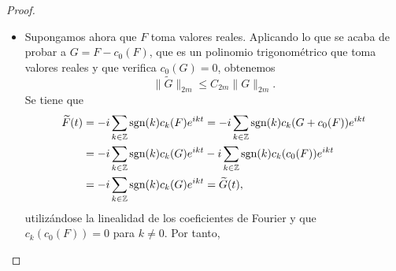 \documentclass[a4paper, 12pt]{book}
\begin{document}
\begin{proof}
\begin{itemize}
\begin{align*}
            &=\Bigl( \frac{1}{2\pi}\integral{-\pi}{\pi}{F(t)^{2k\frac{2m}{2k}}}\Bigr)^{\frac{2k}{2m}}\Bigl( \frac{1}{2\pi}\integral{-\pi}{\pi}{\widetilde{F}(t)^{(2m-2k)\frac{2m}{2m-2k}}}\Bigr)^{\frac{2m-2k}{2m}} \\
            &= \|F\|_{2m}^{2k}\|\widetilde{F}\|_{2m}^{2m-2k}.
        \end{align*}
        Si $k = m$, sigue siendo cierta la desigualdad $\|F^{2k}\widetilde{F}^{2m-2k}\|_1 \leq \|F\|_{2m}^{2k}\|\widetilde{F}\|_{2m}^{2m-2k}$. Tenemos entonces
        \[\|\widetilde{F}\|_{2m}^{2m} \leq \sum_{k=1}^m \binom{2m}{2k}\|F\|_{2m}^{2k}\|\widetilde{F}\|_{2m}^{2m-2k}.\]
        Dividiendo por $\|\widetilde{F}\|_{2m}^{2m}$ (si fuese $\widetilde{F} = 0$ en casi todo punto no hay nada que probar),
        \[1 \leq \sum_{k=1}^m \binom{2m}{2k}\Bigl(\frac{\|F\|_{2m}}{\|\widetilde{F}\|_{2m}}\Bigr)^{2k}.\]
        Sea $R = \frac{\|F\|_{2m}}{\|\widetilde{F}\|_{2m}}$ y consideremos la función $\varphi \colon [0,\infty)\to\R$ dada por
        \[\varphi(t) = \sum_{k=1}^m \binom{2m}{2k}t^{2k}.\]
        La última desigualdad nos dice que $\varphi(R) \geq 1$. También tenemos que $\varphi$ es continua, estrictamente creciente y tal que
        \[\lim_{t \to \infty} \varphi(t) = \infty, \qquad \varphi(0) = 0.\]
        Por el teorema de los valores intermedios, existe $C > 0$ (que solo depende de $m$) tal que $\varphi(C) = 1$. Como $\varphi(R) \geq 1$ y $\varphi$ es estrictamente creciente, tiene que ser $R \geq C$, luego
        \[\|F\|_{2m} \geq C\|\widetilde{F}\|_{2m}.\]
        Llamando $C_{2m} = \frac{1}{C}$, obtenemos que
        \[\|\widetilde{F}\|_{2m} \leq C_{2m}\|F\|_{2m}.\]
        \item Supongamos ahora que $F$ toma valores reales. Aplicando lo que se acaba de probar a $G = F-c_0(F)$, que es un polinomio trigonométrico que toma valores reales y que verifica $c_0(G)=0$, obtenemos
        \[\|\widetilde{G}\|_{2m}\leq C_{2m}\|G\|_{2m}.\]
        Se tiene que
        \begin{align*}
            \widetilde{F}(t) &= -i\sum_{k\in\mathbb Z}\textup{sgn}(k)c_k(F)e^{ikt} = -i\sum_{k\in\mathbb Z}\textup{sgn}(k)c_k(G+c_0(F))e^{ikt} \\
            &= -i\sum_{k\in\mathbb Z}\textup{sgn}(k)c_k(G)e^{ikt}-i\sum_{k\in\mathbb Z}\textup{sgn}(k)c_k(c_0(F))e^{ikt} \\
            &= -i\sum_{k\in\mathbb Z}\textup{sgn}(k)c_k(G)e^{ikt} = \widetilde{G}(t),
        \end{align*}
        utilizándose la linealidad de los coeficientes de Fourier y que $c_k(c_0(F)) = 0$ para $k\neq 0$. Por tanto,

\end{itemize}
\end{proof}
\end{document}
